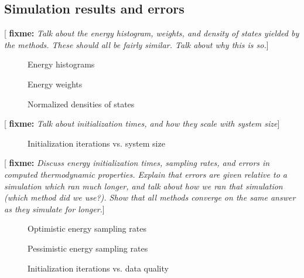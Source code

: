 \documentclass[11pt]{article}
\newcommand{\red}[1]{{\bf \color{red} #1}}
\newcommand{\fixme}[1]{[\red{fixme:} \emph{#1}]}
\begin{document}
\subsection{Simulation results and errors}
\label{sec:results_and_errors}

\fixme{Talk about the energy histogram, weights, and density of states
  yielded by the methods. These should all be fairly similar. Talk
  about why this is so.}

\begin{figure}[H]
  \centering
  \caption[Energy histograms]{Energy histograms}
  \label{fig:histograms}
\end{figure}

\begin{figure}[H]
  \centering
  \caption[Energy weights]{Energy weights}
  \label{fig:weights}
\end{figure}

\begin{figure}[H]
  \centering
  \caption[Normalized densities of states]{Normalized densities of
    states}
  \label{fig:density_of_states}
\end{figure}

\fixme{Talk about initialization times, and how they scale with system
  size}

\begin{figure}[H]
  \centering
  \caption[Initialization iterations vs. system size]{Initialization
    iterations vs. system size}
  \label{fig:scaling}
\end{figure}

\fixme{Discuss energy initialization times, sampling rates, and errors
  in computed thermodynamic properties. Explain that errors are given
  relative to a simulation which ran much longer, and talk about how
  we ran that simulation (which method did we use?). Show that all
  methods converge on the same answer as they simulate for longer.}

\begin{figure}[H]
  \centering
  \caption[Optimistic energy sampling rates]{Optimistic energy
    sampling rates}
  \label{fig:opt_sample_rate}
\end{figure}

\begin{figure}[H]
  \centering
  \caption[Pessimistic energy sampling rates]{Pessimistic energy
    sampling rates}
  \label{fig:pes_sample_rate}
\end{figure}

\begin{figure}[H]
  \centering
  \caption[Initialization iterations vs. data quality]{Initialization
    iterations vs. data quality}
  \label{fig:quality}
\end{figure}
\end{document}
